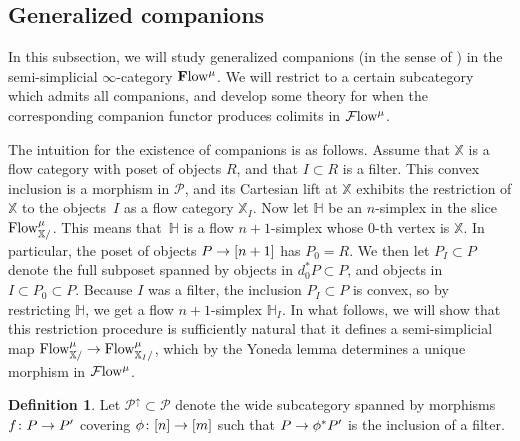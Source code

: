 \documentclass[10pt]{amsart}
\numberwithin{equation}{section}
\theoremstyle{definition}
\newtheorem{definition}[prop]{Definition}
\newcommand{\Flow}{\cF\mathrm{low}\vphantom{w}}
\newcommand{\PreFlow}{\mathrm{Flow}\vphantom{w}}
\newcommand{\bfPreFlow}{\mathbf{F}\mathrm{low}\vphantom{w}}
\newcommand{\bH}{\mathbb{H}}
\newcommand{\bX}{\mathbb{X}}
\newcommand{\cP}{\mathcal{P}}
\newcommand{\cF}{\mathcal{F}}
\renewcommand{\to}{\mathchoice{\longrightarrow}{\rightarrow}{}{}}
\begin{document}
\subsection{Generalized companions}\label{subsec:companions}
In this subsection, we will study generalized companions (in the sense of ) in the semi-simplicial $\infty$-category $\bfPreFlow^{\mu}$.
We will restrict to a certain subcategory which admits all companions, and develop some theory for when the corresponding companion functor produces colimits in $\Flow^{\mu}$.

The intuition for the existence of companions is as follows.
Assume that $\bX$ is a flow category with poset of objects $R$, and that $I\subset R$ is a filter.
This convex inclusion is a morphism in $\cP$, and its Cartesian lift at $\bX$ exhibits the restriction of $\bX$ to the objects~$I$ as a flow category $\bX_{I}$.
Now let $\bH$ be an $n$-simplex in the slice $\PreFlow^{\mu}_{\bX/}$.
This means that~$\bH$ is a flow $n+1$-simplex whose $0$-th vertex is $\bX$.
In particular, the poset of objects $P\to [n+1]$ has $P_{0}=R$.
We then let $P_{I} \subset P$ denote the full subposet spanned by objects in $d_{0}^{*}P \subset P$, and objects in $I\subset P_{0} \subset P$.
Because $I$ was a filter, the inclusion $P_{I}\subset P$ is convex, so by restricting $\bH$, we get a flow $n+1$-simplex $\bH_{I}$.
In what follows, we will show that this restriction procedure is sufficiently natural that it defines a semi-simplicial map $\PreFlow^{\mu}_{\bX/} \to \PreFlow^{\mu}_{\bX_{I}/}$, which by the Yoneda lemma determines a unique morphism in $\Flow^{\mu}$.

\begin{definition}\label{def:P_uparrow}
	Let $\cP^{\uparrow}\subset \cP$ denote the wide subcategory spanned by morphisms $f\colon P \to P'$ covering $\phi \colon [n] \to [m]$ such that $P \to \phi^{*}P'$ is the inclusion of a filter.
\end{definition}
\end{document}
